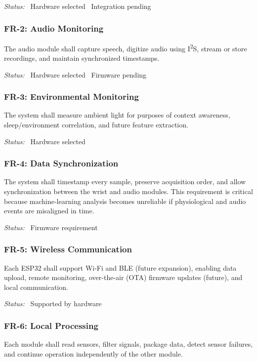 \noindent\textit{Status:} \doneTag\ Hardware selected \quad \pendingTag\ Integration pending

\subsubsection{FR-2: Audio Monitoring}
The audio module shall capture speech, digitize audio using I\textsuperscript{2}S, stream or store recordings, and maintain synchronized timestamps.

\noindent\textit{Status:} \doneTag\ Hardware selected \quad \pendingTag\ Firmware pending

\subsubsection{FR-3: Environmental Monitoring}
The system shall measure ambient light for purposes of context awareness, sleep/environment correlation, and future feature extraction.

\noindent\textit{Status:} \doneTag\ Hardware selected

\subsubsection{FR-4: Data Synchronization}
The system shall timestamp every sample, preserve acquisition order, and allow synchronization between the wrist and audio modules. This requirement is critical because machine-learning analysis becomes unreliable if physiological and audio events are misaligned in time.

\noindent\textit{Status:} \pendingTag\ Firmware requirement

\subsubsection{FR-5: Wireless Communication}
Each ESP32 shall support Wi-Fi and BLE (future expansion), enabling data upload, remote monitoring, over-the-air (OTA) firmware updates (future), and local communication.

\noindent\textit{Status:} \doneTag\ Supported by hardware

\subsubsection{FR-6: Local Processing}
Each module shall read sensors, filter signals, package data, detect sensor failures, and continue operation independently of the other module.

